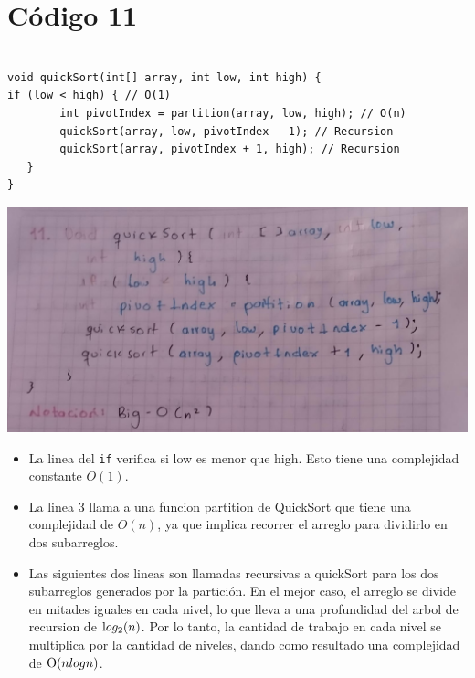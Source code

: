 \documentclass[a4paper,onecolumn,10pt]{article}
\begin{document}
\section{Código 11}

\begin{verbatim}

void quickSort(int[] array, int low, int high) {
if (low < high) { // O(1)
        int pivotIndex = partition(array, low, high); // O(n)
        quickSort(array, low, pivotIndex - 1); // Recursion
        quickSort(array, pivotIndex + 1, high); // Recursion  
   }
}

\end{verbatim}

\includegraphics[width=1\linewidth]{imagenes/punto 11.jpeg}

\begin{itemize}

    \item La linea del \texttt{if} verifica si low es menor que high. Esto tiene una complejidad constante $O(1)$.
    
    \item La linea 3 llama a una funcion partition de QuickSort que tiene una complejidad de $O(n)$, ya que implica recorrer el arreglo para dividirlo en dos subarreglos. 
    
    \item Las siguientes dos lineas son llamadas recursivas a quickSort para los dos subarreglos generados por la partición. En el mejor caso, el arreglo se divide en mitades iguales en cada nivel, lo que lleva a una profundidad del arbol de recursion de  $\text log_2(n)$. Por lo tanto, la cantidad de trabajo en cada nivel se multiplica por la cantidad de niveles, dando como resultado una complejidad de  $\text O(n log n)$.
    
\end{itemize}
\end{document}
